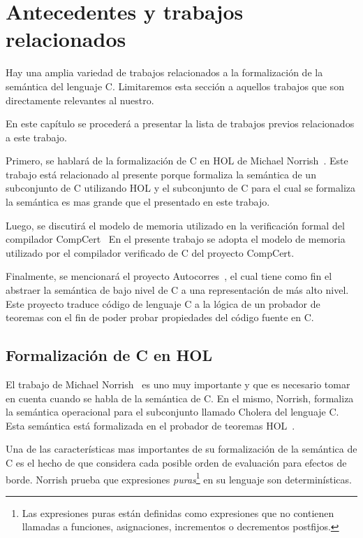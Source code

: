 \chapter{Antecedentes y trabajos relacionados}\label{chapter:previous}


Hay una amplia variedad de trabajos relacionados a la formalización de la semántica del lenguaje C.
Limitaremos esta sección a aquellos trabajos que son directamente relevantes al nuestro.

En este capítulo se procederá a presentar la lista de trabajos previos relacionados a este trabajo.

Primero, se hablará de la formalización de C en HOL de Michael Norrish~\cite{norrish}.
Este trabajo está relacionado al presente porque formaliza la semántica de un subconjunto de C utilizando HOL y el subconjunto de C para el cual se formaliza la semántica es mas grande que el presentado en este trabajo.

Luego, se discutirá el modelo de memoria utilizado en la verificación formal del compilador CompCert~\cite{leroy-blazy-memory-model}
En el presente trabajo se adopta el modelo de memoria utilizado por el compilador verificado de C del proyecto CompCert.

Finalmente, se mencionará el proyecto Autocorres~\cite{autocorres}, el cual tiene como fin el abstraer la semántica de bajo nivel de C a una representación de más alto nivel.
Este proyecto traduce código de lenguaje C a la lógica de un probador de teoremas con el fin de poder probar propiedades del código fuente en C.

\section{Formalización de C en HOL}

El trabajo de Michael Norrish~\cite{norrish} es uno muy importante y que es necesario tomar en cuenta cuando se habla de la semántica de C.
En el mismo, Norrish, formaliza la semántica operacional para el subconjunto llamado Cholera del lenguaje C.
Esta semántica está formalizada en el probador de teoremas HOL~\cite{hol-doc}.

Una de las características mas importantes de su formalización de la semántica de C es el hecho de que considera cada posible orden de evaluación para efectos de borde.
Norrish prueba que expresiones \textit{puras}\footnote{Las expresiones puras están definidas como expresiones que no contienen llamadas a funciones, asignaciones, incrementos o decrementos postfijos.} en su lenguaje son determinísticas.

